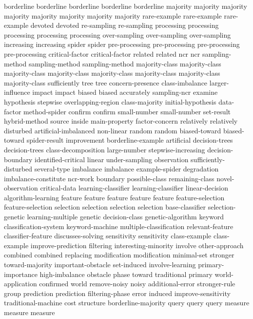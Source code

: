 borderline	borderline	borderline	borderline	borderline	
majority	majority	majority	majority	majority	majority	majority	majority	
rare-example	rare-example	rare-example	
devoted	devoted	
re-sampling	re-sampling	
processing	processing	processing	processing	processing	
over-sampling	over-sampling	over-sampling	
increasing	increasing	
spider	spider	
pre-processing	pre-processing	pre-processing	pre-processing	
critical-factor	critical-factor	
related	related	
ncr	ncr	
sampling-method	sampling-method	sampling-method	
majority-class	majority-class	majority-class	majority-class	majority-class	majority-class	majority-class	majority-class	
sufficiently	
tree	tree	
concern-presence	
class-imbalance	
larger-influence	
impact	impact	
biased	biased	
accurately	
sampling-ncr	
examine	
hypothesis	
stepwise	
overlapping-region	
class-majority	
initial-hypothesis	
data-factor	
method-spider	
confirm	confirm	
small-number	small-number	
set-result	
hybrid-method	
source	
inside	
main-property	
factor-concern	
relatively	relatively	
disturbed	
artificial-imbalanced	
non-linear	
random	random	
biased-toward	biased-toward	
spider-result	
improvement	
borderline-example	
artificial	
decision-trees	decision-trees	
class-decomposition	
large-number	
stepwise-increasing	
decision-boundary	
identified-critical	
linear	
under-sampling	
observation	
sufficiently-disturbed	
several-type	
imbalance	imbalance	
example-spider	
degradation	
imbalance-constitute	
ncr-work	
boundary	
possible-class	
remaining-class	
novel-observation	
critical-data	
learning-classifier	learning-classifier	
linear-decision	
algorithm-learning	
feature	feature	feature	feature	feature	
feature-selection	feature-selection	
selection	selection	selection	selection	
base-classifier	
selection-genetic	
learning-multiple	
genetic	
decision-class	
genetic-algorithm	
keyword	
classification-system	
keyword-machine	
multiple-classification	
relevant-feature	
classifier-feature	
discusses-solving	
sensitivity	sensitivity	
class-example	class-example	
improve-prediction	
filtering	
interesting-minority	
involve	
other-approach	
combined	combined	
replacing	
modification	modification	
minimal-set	
stronger	
toward-majority	
important-obstacle	
set-induced	
involve-learning	
primary-importance	
high-imbalance	
obstacle	
phase	
toward	
traditional	
primary	
world-application	
confirmed	
world	
remove-noisy	
noisy	
additional-error	
stronger-rule	
group	
prediction	prediction	
filtering-phase	
error	
induced	
improve-sensitivity	
traditional-machine	
cost	
structure	
borderline-majority	
query	query	query	
measure	measure	measure	

